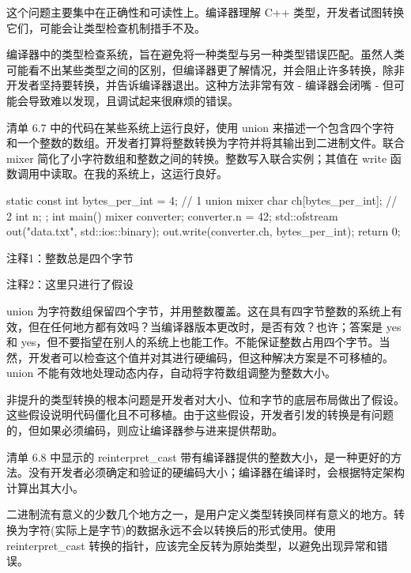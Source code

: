 这个问题主要集中在正确性和可读性上。编译器理解 C++ 类型，开发者试图转换它们，可能会让类型检查机制措手不及。


编译器中的类型检查系统，旨在避免将一种类型与另一种类型错误匹配。虽然人类可能看不出某些类型之间的区别，但编译器更了解情况，并会阻止许多转换，除非开发者坚持要转换，并告诉编译器退出。这种方法非常有效 - 编译器会闭嘴 - 但可能会导致难以发现，且调试起来很麻烦的错误。

清单 6.7 中的代码在某些系统上运行良好，使用 union 来描述一个包含四个字符和一个整数的数组。开发者打算将整数转换为字符并将其输出到二进制文件。联合 mixer 简化了小字符数组和整数之间的转换。整数写入联合实例；其值在 write 函数调用中读取。在我的系统上，这运行良好。


\begin{cpp}
static const int bytes_per_int = 4; // 1
  union mixer {
  char ch[bytes_per_int]; // 2
  int n;
};
int main() {
  mixer converter;
  converter.n = 42;
  std::ofstream out("data.txt", std::ios::binary);
  out.write(converter.ch, bytes_per_int);
  return 0;
}
\end{cpp}

{\footnotesize
注释1：整数总是四个字节

注释2：这里只进行了假设
}


union 为字符数组保留四个字节，并用整数覆盖。这在具有四字节整数的系统上有效，但在任何地方都有效吗？当编译器版本更改时，是否有效？也许；答案是 yes 和 yes，但不要指望在别人的系统上也能工作。不能保证整数占用四个字节。当然，开发者可以检查这个值并对其进行硬编码，但这种解决方案是不可移植的。union 不能有效地处理动态内存，自动将字符数组调整为整数大小。


非提升的类型转换的根本问题是开发者对大小、位和字节的底层布局做出了假设。这些假设说明代码僵化且不可移植。由于这些假设，开发者引发的转换是有问题的，但如果必须编码，则应让编译器参与进来提供帮助。

清单 6.8 中显示的 reinterpret\_cast 带有编译器提供的整数大小，是一种更好的方法。没有开发者必须确定和验证的硬编码大小；编译器在编译时，会根据特定架构计算出其大小。

二进制流有意义的少数几个地方之一，是用户定义类型转换同样有意义的地方。转换为字符(实际上是字节)的数据永远不会以转换后的形式使用。使用 reinterpret\_cast 转换的指针，应该完全反转为原始类型，以避免出现异常和错误。


